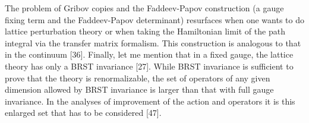 The problem of Gribov copies and the Faddeev-Papov construction (a gauge
fixing term and the Faddeev-Papov determinant) resurfaces when one wants to
do lattice perturbation theory or when taking the Hamiltonian limit of the
path integral via the transfer matrix formalism. This construction is
analogous to that in the continuum [36]. Finally, let me mention that in a
fixed gauge, the lattice theory has only a BRST invariance [27]. While BRST
invariance is sufficient to prove that the theory is renormalizable, the set
of operators of any given dimension allowed by BRST invariance is larger than
that with full gauge invariance. In the analyses of improvement of the action
and operators it is this enlarged set that has to be considered [47].
